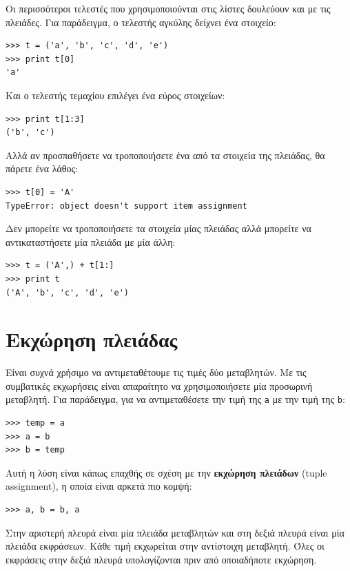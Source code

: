 \documentclass[10pt]{book}
\begin{document}
Οι περισσότεροι τελεστές που χρησιμοποιούνται στις λίστες δουλεύουν και με τις πλειάδες. Για παράδειγμα, ο τελεστής αγκύλης δείχνει ένα στοιχείο:

\begin{verbatim}
>>> t = ('a', 'b', 'c', 'd', 'e')
>>> print t[0]
'a'
\end{verbatim}
%
Και ο τελεστής τεμαχίου επιλέγει ένα εύρος στοιχείων:

\begin{verbatim}
>>> print t[1:3]
('b', 'c')
\end{verbatim}
%
Αλλά αν προσπαθήσετε να τροποποιήσετε ένα από τα στοιχεία της πλειάδας, θα πάρετε ένα λάθος:

\begin{verbatim}
>>> t[0] = 'A'
TypeError: object doesn't support item assignment
\end{verbatim}
%
Δεν μπορείτε να τροποποιήσετε τα στοιχεία μίας πλειάδας αλλά μπορείτε να αντικαταστήσετε μία πλειάδα με μία άλλη:

\begin{verbatim}
>>> t = ('A',) + t[1:]
>>> print t
('A', 'b', 'c', 'd', 'e')
\end{verbatim}
%

 
\section{Εκχώρηση πλειάδας}
\label{tuple.assignment}

Είναι συχνά χρήσιμο να αντιμεταθέτουμε τις τιμές δύο μεταβλητών. Με τις συμβατικές εκχωρήσεις είναι απαραίτητο να χρησιμοποιήσετε μία προσωρινή μεταβλητή. Για παράδειγμα, για να αντιμεταθέσετε την τιμή της {\tt a} με την τιμή της {\tt b}:

\begin{verbatim}
>>> temp = a
>>> a = b
>>> b = temp
\end{verbatim}
%
Αυτή η λύση είναι κάπως επαχθής σε σχέση με την {\bf εκχώρηση πλειάδων} (tuple assignment), η οποία είναι αρκετά πιο κομψή:

\begin{verbatim}
>>> a, b = b, a
\end{verbatim}
%
Στην αριστερή πλευρά είναι μία πλειάδα μεταβλητών και στη δεξιά πλευρά είναι μία πλειάδα εκφράσεων. Κάθε τιμή εκχωρείται στην αντίστοιχη μεταβλητή. Όλες οι εκφράσεις στην δεξιά πλευρά υπολογίζονται πριν από οποιαδήποτε εκχώρηση.
\end{document}
